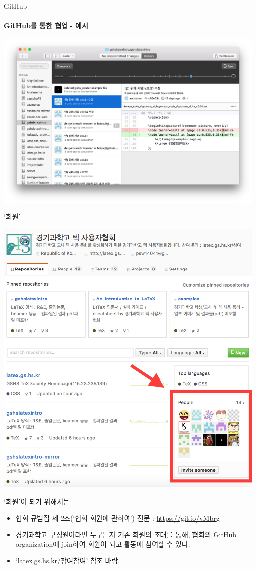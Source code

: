 \documentclass[12pt]{beamer}
\begin{document}
\begin{frame}{GitHub}
	\framesubtitle{GitHub를 통한 협업 - 예시}
	\begin{center}
		\includegraphics[width=\textwidth]{GitHub_example.png}
	\end{center}
\end{frame}
\begin{frame}{`회원'}
	\begin{center}
		\includegraphics[width=.7\textwidth]{GitHub_gshslatexintro_people.png}
	\end{center}
\end{frame}
\begin{frame}{`회원'이 되기 위해서는}
	\begin{itemize}
		\item 협회 규범집 제 2조(`협회 회원에 관하여') 전문 : \url{https://git.io/vMbrg}
		\item 경기과학고 구성원이라면 누구든지 기존 회원의 초대를 통해,
		협회의 GitHub organization에 join하여 회원이 되고 활동에 참여할 수 있다.
	\end{itemize}
	\begin{itemize}
		\item `\url{latex.gs.hs.kr/참여}참여' 참조 바람.
	\end{itemize}
\end{frame}
\end{document}
